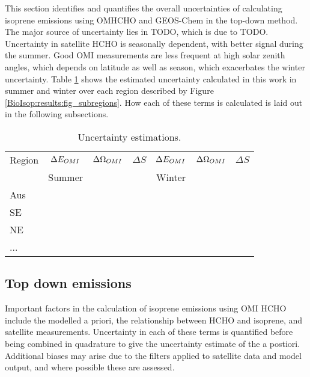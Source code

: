   This section identifies and quantifies the overall uncertainties of calculating isoprene emissions using OMHCHO and GEOS-Chem in the top-down method.
  The major source of uncertainty lies in TODO, which is due to TODO.
  Uncertainty in satellite HCHO is seasonally dependent, with better signal during the summer. 
  Good OMI measurements are less frequent at high solar zenith angles, which depends on latitude as well as season, which exacerbates the winter uncertainty.
  Table \ref{BioIsop:uncertainty:tab_uncertainties} shows the estimated uncertainty calculated in this work in summer and winter over each region described by Figure \ref{BioIsop:results:fig_subregions}.
  How each of these terms is calculated is laid out in the following subsections.
  
  \begin{table}\begin{threeparttable}
      \caption{Uncertainty estimations.}
      \begin{tabular}{ l | c  c  c | c c c} 
        \toprule
        Region & $\Delta E_{OMI}$ & $\Delta \Omega_{OMI}$ & $\Delta S$ 
          & $\Delta E_{OMI}$ & $\Delta \Omega_{OMI}$ & $\Delta S$ \\
         & Summer & & & Winter & & \\
        \midrule
          Aus & & & & & & \\
          SE & & & & & & \\
          NE & & & & & & \\
          ... & & & & & & \\
        \bottomrule
      \end{tabular}
      \label{BioIsop:uncertainty:tab_uncertainties}
    \end{threeparttable}\end{table}
    
    
  
  \subsection{Top down emissions}
    \label{BioIsop:uncertainty:eomi}
    
    Important factors in the calculation of isoprene emissions using OMI HCHO include the modelled a priori, the relationship between HCHO and isoprene, and satellite measurements.
    Uncertainty in each of these terms is quantified before being combined in quadrature to give the uncertainty estimate of the a postiori.
    Additional biases may arise due to the filters applied to satellite data and model output, and where possible these are assessed. 
    
